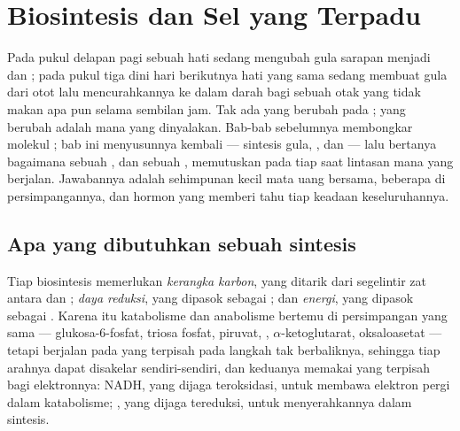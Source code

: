 \chapter{Biosintesis dan Sel yang Terpadu}\label{ch:b1:biosyntheses-integration}

Pada pukul delapan pagi sebuah hati sedang mengubah gula sarapan
menjadi  dan ; pada pukul tiga dini hari berikutnya hati
yang sama sedang membuat gula dari  otot lalu mencurahkannya
ke dalam darah bagi sebuah otak yang tidak makan apa pun selama sembilan
jam. Tak ada yang berubah pada ; yang berubah adalah  mana
yang dinyalakan. Bab-bab sebelumnya membongkar molekul ; bab ini
menyusunnya kembali --- sintesis gula, ,  dan 
--- lalu bertanya bagaimana sebuah , dan sebuah , memutuskan
pada tiap saat lintasan mana yang berjalan. Jawabannya adalah sehimpunan
kecil mata uang bersama, beberapa  di persimpangannya, dan hormon
yang memberi tahu tiap  keadaan keseluruhannya.

\section{Apa yang dibutuhkan sebuah sintesis}

\begin{proposition}\label{prop:b1:biosyntheses-integration:needs}
Tiap biosintesis memerlukan \emph{kerangka karbon}, yang ditarik dari
segelintir zat antara  dan ; \emph{daya reduksi},
yang dipasok sebagai ; dan \emph{energi}, yang dipasok sebagai
. Karena itu katabolisme dan anabolisme bertemu di persimpangan yang
sama --- glukosa-6-fosfat, triosa fosfat, piruvat, ,
$\alpha$-ketoglutarat, oksaloasetat --- tetapi berjalan pada  yang
terpisah pada langkah tak berbaliknya, sehingga tiap arahnya dapat
disakelar sendiri-sendiri, dan keduanya memakai  yang terpisah
bagi elektronnya: NADH, yang dijaga teroksidasi, untuk membawa elektron
pergi dalam katabolisme; , yang dijaga tereduksi, untuk
menyerahkannya dalam sintesis.
\end{proposition}

